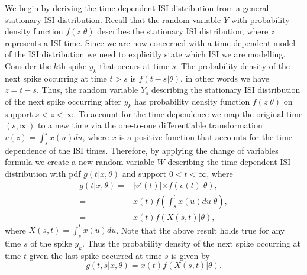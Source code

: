 \documentclass[oneside, 12 pt]{book}
\begin{document}
We begin by deriving the time dependent ISI distribution from a general stationary ISI distribution. 
Recall that the random variable $Y$ with probability density function $f(z|\theta)$ describes the stationary ISI distribution, where $z$ represents a ISI time. Since we are now concerned with a time-dependent model of the ISI distribution we need to explicitly state which ISI we are modelling.  Consider the $k$th spike $y_k$ that occurs at time $s$. The probability density of the next spike occurring at time $t > s$ is $f(t-s|\theta)$, in other words we have $z = t-s$. Thus, the random variable $Y_s$ describing the stationary ISI distribution of the next spike occurring after $y_k$ has probability density function $f(z|\theta)$ on support $s < z <\infty$. To account for the time dependence we map the original time $(s,\infty)$ to a new time via the one-to-one differentiable transformation $v(z) = \int^z_s x(u) du$, where $x$ is a positive function that accounts for the time dependence of the ISI times. Therefore, by applying the change of variables formula we create a new random variable $W$ describing the time-dependent ISI distribution with pdf $g(t|x,\theta)$ and support $0<t<\infty$, where
\begin{align*}
	g(t|x,\theta) =&  \lvert v'(t) \lvert \times  f(v(t)|\theta) ,  \\
	 =& x(t) f(\int^t_s x(u) du | \theta), \\
	 =& x(t) f(X(s,t) | \theta),
\end{align*}
 where $X(s,t) = \int^t_s x(u)du$. Note that the above result holds true for any time $s$ of the spike $y_k$. Thus the probability density of the next spike occurring at time $t$ given the last spike occurred at time $s$ is given by
 \begin{equation} \label{eq:transformation}
g(t,s| x,\theta) = x(t)f(X(s,t)|\theta). 	
 \end{equation}
\end{document}
